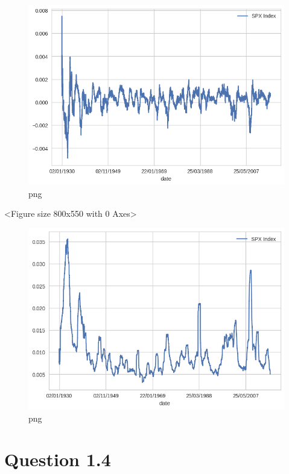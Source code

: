\begin{figure}[h]
\centering
\includegraphics[scale=0.75]{ProcessingStockPriceData_files/ProcessingStockPriceData_8_5.png}
\caption{png}
\end{figure}

\begin{python}
<Figure size 800x550 with 0 Axes>
\end{python}

\begin{figure}[h]
\centering
\includegraphics[scale=0.75]{ProcessingStockPriceData_files/ProcessingStockPriceData_8_7.png}
\caption{png}
\end{figure}

\hypertarget{question-1.4}{%
\section{Question 1.4}\label{question-1.4}}

